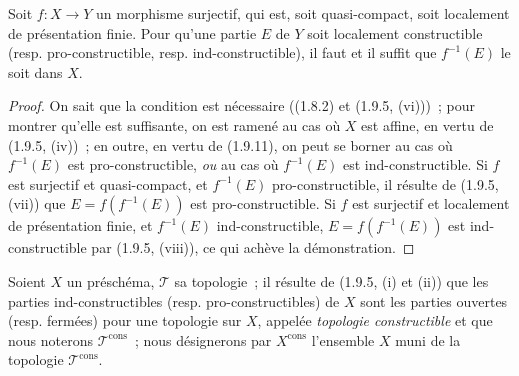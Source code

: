 \begin{corollary}[1.9.12]
\label{IV.1.9.12-fr}
Soit $f:X\to Y$ un morphisme surjectif, qui est, soit quasi-compact, soit
localement de présentation finie. Pour qu'une partie $E$ de $Y$ soit
localement constructible (resp. pro-constructible, resp. ind-constructible),
il faut et il suffit que $f^{-1}(E)$ le soit dans $X$.
\end{corollary}


\begin{proof}
On sait que la condition est nécessaire ((1.8.2) et (1.9.5, (vi)))~; pour
montrer qu'elle est suffisante, on est ramené au cas où $X$ est affine, en
vertu de (1.9.5, (iv))~; en outre, en vertu de (1.9.11), on peut se borner au
cas où $f^{-1}(E)$ est pro-constructible, \emph{ou} au cas où $f^{-1}(E)$ est
ind-constructible. Si $f$ est surjectif et quasi-compact, et $f^{-1}(E)$
pro-constructible, il résulte de (1.9.5, (vii)) que
$E=f(f^{-1}(E))$ est pro-constructible. Si $f$ est surjectif et localement de
présentation finie, et $f^{-1}(E)$ ind-constructible,
$E=f(f^{-1}(E))$ est ind-constructible par (1.9.5, (viii)), ce qui achève la
démonstration.
\end{proof}

\begin{env}[1.9.13]
\label{IV.1.9.13-fr}
Soient $X$ un préschéma, $\mathscr T$ sa topologie~; il résulte de (1.9.5,
(i) et (ii)) que les parties ind-constructibles (resp. pro-constructibles) de
$X$ sont les parties ouvertes (resp. fermées) pour une topologie sur $X$,
appelée \emph{topologie constructible} et que nous noterons
$\mathscr T^{\mathrm{cons}}$~; nous désignerons par $X^{\mathrm{cons}}$
l'ensemble $X$ muni de la topologie $\mathscr T^{\mathrm{cons}}$.
\end{env}

